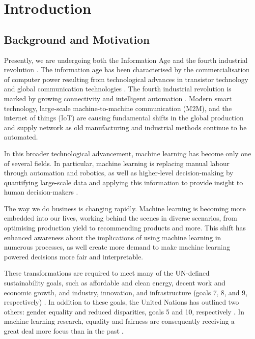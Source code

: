 
\chapter{Introduction}
\label{ch:intro}

\section{Background and Motivation}

\label{sec:intro:background}

Presently, we are undergoing both the Information Age and the fourth industrial revolution \citep{Castells:2009:Book, Hamdan:2021:Book}. The information age has been characterised by the commercialisation of computer power resulting from technological advances in transistor technology and global communication technologies \citep[p.~30]{Castells:2009:Book}. The fourth industrial revolution is marked by growing connectivity and intelligent automation \citep{Bai:2020:IJPE}. Modern smart technology, large-scale machine-to-machine communication (M2M), and the internet of things (IoT) are causing fundamental shifts in the global production and supply network as old manufacturing and industrial methods continue to be automated. 

In this broader technological advancement, machine learning has become only one of several fields. In particular, machine learning is replacing manual labour through automation and robotics, as well as higher-level decision-making by quantifying large-scale data and applying this information to provide insight to human decision-makers \citep{Hamdan:2021:Book}.

The way we do business is changing rapidly. Machine learning is becoming more embedded into our lives, working behind the scenes in diverse scenarios, from optimising production yield to recommending products and more. This shift has enhanced awareness about the implications of using machine learning in numerous processes, as well create more demand to make machine learning powered decisions more fair and interpretable.

These transformations are required to meet many of the UN-defined sustainability goals, such as affordable and clean energy, decent work and economic growth, and industry, innovation, and infrastructure (goals 7, 8, and 9, respectively) \citep{Bai:2020:IJPE}. In addition to these goals, the United Nations has outlined two others: gender equality and reduced disparities, goals 5 and 10, respectively \citep{UN:2015:Resolution}. In machine learning research, equality and fairness are consequently receiving a great deal more focus than in the past \cite{Mehrabi:2021:CSUR}.

